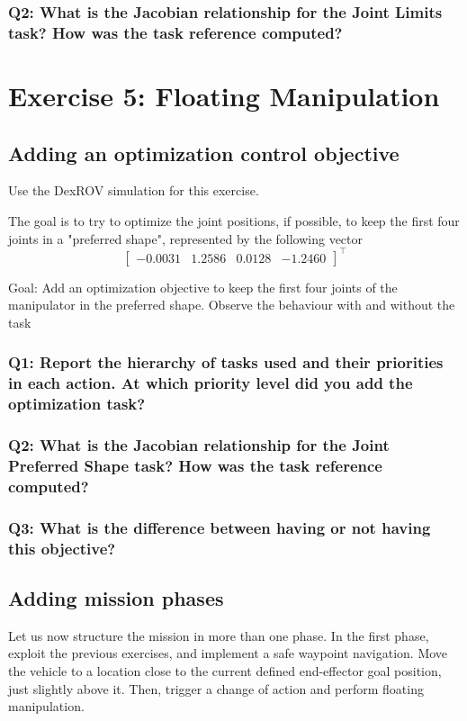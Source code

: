 \documentclass{article}
\begin{document}
\subsubsection{Q2: What is the Jacobian relationship for the Joint Limits task? How was the task reference computed?}

\clearpage
\section{Exercise 5: Floating Manipulation}
\subsection{Adding an optimization control objective}
Use the DexROV simulation for this exercise. 

The goal is to try to optimize the joint positions, if possible, to keep the first four joints in a "preferred shape", represented by the following vector
\begin{displaymath}
\begin{bmatrix}-0.0031 & 1.2586 & 0.0128 & -1.2460 \end{bmatrix}^\top
\end{displaymath}

Goal: Add an optimization objective to keep the first four joints of the manipulator in the preferred shape. Observe the behaviour with and without the task

\subsubsection{Q1: Report the hierarchy of tasks used and their priorities in each action. At which priority level did you add the optimization task?}

\subsubsection{Q2: What is the Jacobian relationship for the Joint Preferred Shape task? How was the task reference computed?}

\subsubsection{Q3: What is the difference between having or not having this objective?}

\subsection{Adding mission phases}
Let us now structure the mission in more than one phase. In the first phase, exploit the previous exercises, and implement a safe waypoint navigation. Move the vehicle to a location close to the current defined end-effector goal position, just slightly above it. Then, trigger a change of action and perform floating manipulation.
\end{document}
